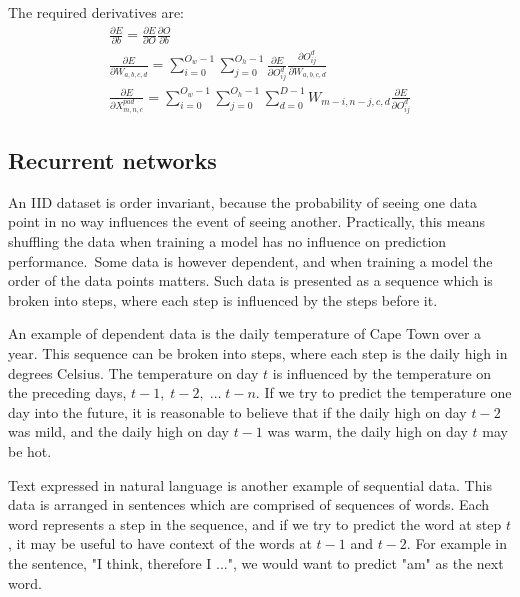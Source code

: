 \noindent The required derivatives are:
\begin{subequations}
	\begin{gather}
		\frac{\partial E} {\partial b} = \frac{\partial E} {\partial O}\frac{\partial O} {\partial b} \\
		\frac{\partial E} {\partial W_{a,b,c,d}} = \sum_{i=0}^{O_w - 1}\sum_{j=0}^{O_h - 1}\frac{\partial E} {\partial O_{ij}^{d}}\frac{\partial O_{ij}^d} {\partial W_{a,b,c,d}} \\
		\frac{\partial E} {\partial X_{m,n,c}^{pad}} = \sum_{i=0}^{O_w - 1}\sum_{j=0}^{O_h - 1}\sum_{d=0}^{D - 1}W_{m-i,n-j,c,d}\frac{\partial E} {\partial O_{ij}^{d}}
	\end{gather}
\end{subequations}


\subsection{Recurrent networks}

An IID dataset is order invariant, because the probability of seeing one data point in no way influences the event of seeing another. Practically, this means shuffling the data when training a model has no influence on prediction performance.\ Some data is however dependent, and when training a model the order of the data points matters. Such data is presented as a sequence which is broken into steps, where each step is influenced by the steps before it. \par

\noindent An example of dependent data is the daily temperature of Cape Town over a year. This sequence can be broken into steps, where each step is the daily high in degrees Celsius. The temperature on day $ t $ is influenced by the temperature on the preceding days, $ t - 1, \; t - 2, \; \dots \; t - n $. If we try to predict the temperature one day into the future, it is reasonable to believe that if the daily high on day $ t - 2 $ was mild, and the daily high on day $ t - 1 $ was warm, the daily high on day $ t $ may be hot. \par
 
\noindent Text expressed in natural language is another example of sequential data. This data is arranged in sentences which are comprised of sequences of words. Each word represents a step in the sequence, and if we try to predict the word at step $ t $, it may be useful to have context of the words at $t -1$ and $t - 2$. For example in the sentence, "I think, therefore I ...", we would want to predict "am" as the next word. \par

